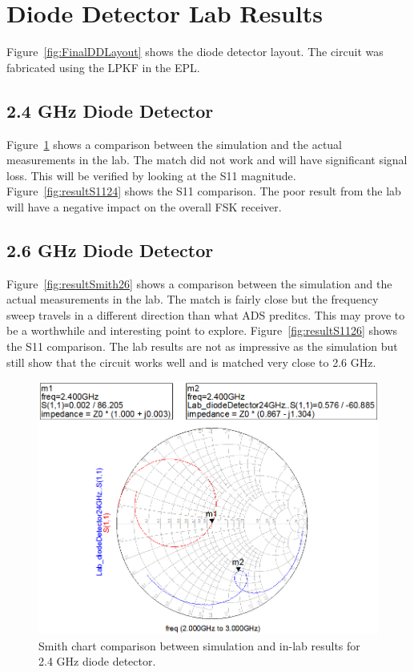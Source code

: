 \documentclass[conference]{IEEEtran}
\begin{document}
\section{Diode Detector Lab Results}
Figure~\ref{fig:FinalDDLayout} shows the diode detector layout.  The circuit was fabricated using the LPKF in the EPL.
\subsection{2.4 GHz Diode Detector}
Figure~\ref{fig:resultSmith24} shows a comparison between the simulation and the actual measurements in the lab.  The match did not work and will have significant signal loss.  This will be verified by looking at the S11 magnitude. Figure~\ref{fig:resultS1124} shows the S11 comparison.  The poor result from the lab will have a negative impact on the overall FSK receiver.
\subsection{2.6 GHz Diode Detector}
 Figure~\ref{fig:resultSmith26} shows a comparison between the simulation and the actual measurements in the lab.  The match is fairly close but the frequency sweep travels in a different direction than what ADS preditcs.  This may prove to be a worthwhile and interesting point to explore. Figure~\ref{fig:resultS1126} shows the S11 comparison.  The lab results are not as impressive as the simulation but still show that the circuit works well and is matched very close to 2.6 GHz.

\begin{figure}[!htb]
\centering
\includegraphics[scale=0.4]{diode-pics/diodedetectorLab24Smith.png}
\caption{Smith chart comparison between simulation and in-lab results for 2.4 GHz diode detector.}
\label{fig:resultSmith24}
\end{figure}
\end{document}
